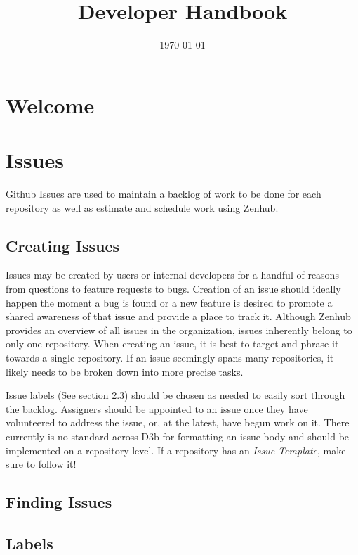 \documentclass[a4paper,12pt,titlepage]{scrartcl}
\title{Developer Handbook}
\date{\today}
\begin{document}
	\maketitle
	
	\tableofcontents
	\newpage
   
	\section{Welcome}
   
 	\section{Issues}
 	
 	Github Issues are used to maintain a backlog of work to be done for each repository as well as estimate and schedule work using Zenhub.
 	
	\subsection{Creating Issues}
	
	Issues may be created by users or internal developers for a handful of reasons from questions to feature requests to bugs.
	Creation of an issue should ideally happen the moment a bug is found or a new feature is desired to promote a shared awareness of that issue and provide a place to track it.
	Although Zenhub provides an overview of all issues in the organization, issues inherently belong to only one repository.
	When creating an issue, it is best to target and phrase it towards a single repository.
	If an issue seemingly spans many repositories, it likely needs to be broken down into more precise tasks.
	
	Issue labels (See section \ref{labels}) should be chosen as needed to easily sort through the backlog.
	Assigners should be appointed to an issue once they have volunteered to address the issue, or, at the latest, have begun work on it.
	There currently is no standard across D3b for formatting an issue body and should be implemented on a repository level.
	If a repository has an {\em Issue Template}, make sure to follow it!
      
	\subsection{Finding Issues}
	
	\subsection{Labels}\label{labels}
	
\end{document}
